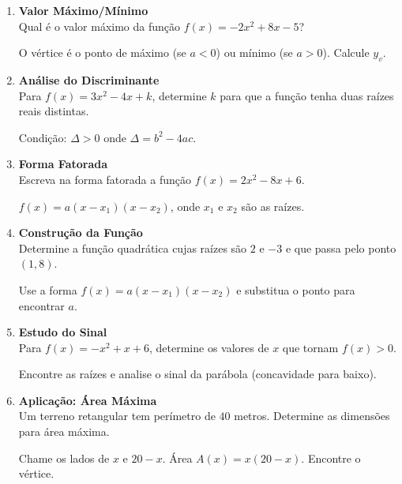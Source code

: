 \documentclass[11pt]{article}
\begin{document}
\begin{multicols}{2}
\begin{enumerate}
\item \textbf{Valor Máximo/Mínimo}\\
Qual é o valor máximo da função $f(x) = -2x^2 + 8x - 5$?
\begin{tcolorbox}[colback=explanationbg,colframe=titleblue,title=Dica:]
O vértice é o ponto de máximo (se $a < 0$) ou mínimo (se $a > 0$). Calcule $y_v$.
\end{tcolorbox}

\item \textbf{Análise do Discriminante}\\
Para $f(x) = 3x^2 - 4x + k$, determine $k$ para que a função tenha duas raízes reais distintas.
\begin{tcolorbox}[colback=explanationbg,colframe=titleblue,title=Dica:]
Condição: $\Delta > 0$ onde $\Delta = b^2 - 4ac$.
\end{tcolorbox}

\item \textbf{Forma Fatorada}\\
Escreva na forma fatorada a função $f(x) = 2x^2 - 8x + 6$.
\begin{tcolorbox}[colback=explanationbg,colframe=titleblue,title=Dica:]
$f(x) = a(x - x_1)(x - x_2)$, onde $x_1$ e $x_2$ são as raízes.
\end{tcolorbox}

\item \textbf{Construção da Função}\\
Determine a função quadrática cujas raízes são $2$ e $-3$ e que passa pelo ponto $(1, 8)$.
\begin{tcolorbox}[colback=explanationbg,colframe=titleblue,title=Dica:]
Use a forma $f(x) = a(x - x_1)(x - x_2)$ e substitua o ponto para encontrar $a$.
\end{tcolorbox}

\item \textbf{Estudo do Sinal}\\
Para $f(x) = -x^2 + x + 6$, determine os valores de $x$ que tornam $f(x) > 0$.
\begin{tcolorbox}[colback=explanationbg,colframe=titleblue,title=Dica:]
Encontre as raízes e analise o sinal da parábola (concavidade para baixo).
\end{tcolorbox}

\item \textbf{Aplicação: Área Máxima}\\
Um terreno retangular tem perímetro de $40$ metros. Determine as dimensões para área máxima.
\begin{tcolorbox}[colback=explanationbg,colframe=titleblue,title=Dica:]
Chame os lados de $x$ e $20 - x$. Área $A(x) = x(20 - x)$. Encontre o vértice.
\end{tcolorbox}


\end{enumerate}
\end{multicols}
\end{document}

